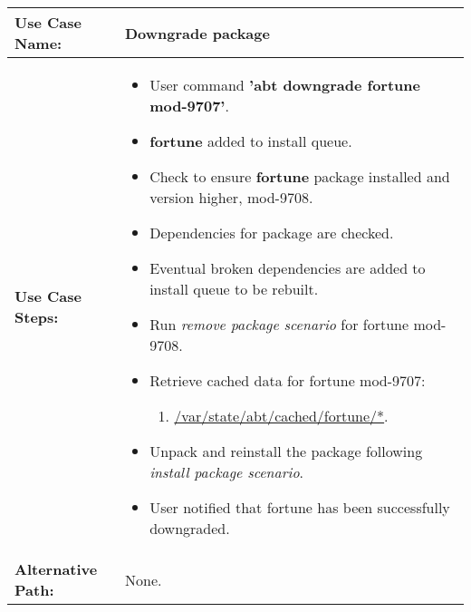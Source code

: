 \medskip

\begin{tabularx}{\linewidth}{|l|X|}
\hline
\textbf{Use Case Name:} & \textbf{Downgrade package} \\
\hline
\textbf{Use Case Steps:} & 
\begin{minipage}{\linewidth} 
  \vspace{0.05em}
  \begin{itemize}
    \item User command \textbf{'abt downgrade fortune mod-9707'}.
    \item \textbf{fortune} added to install queue.
    \item Check to ensure \textbf{fortune} package installed and version higher, mod-9708.
    \item Dependencies for package are checked.
    \item Eventual broken dependencies are added to install queue to be rebuilt.
    \item Run \textit{remove package scenario} for fortune mod-9708.
    \item Retrieve cached data for fortune mod-9707:
    \begin{enumerate}
      \item \url{/var/state/abt/cached/fortune/*}.
    \end{enumerate}
    \item Unpack and reinstall the package following \textit{install package scenario}.
    \item User notified that fortune has been successfully downgraded.
  \end{itemize}
  \vspace{0.05em}
\end{minipage}
\\
\hline
\textbf{Alternative Path:} & None. 
\\
\hline
\end{tabularx}